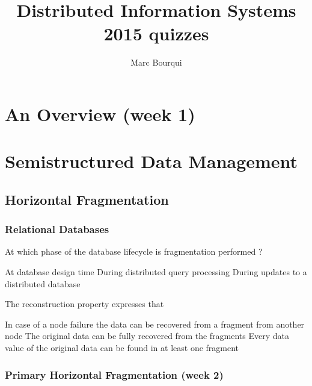 \documentclass[12pt,a4paper]{exam} %
\author{Marc Bourqui}
\title{Distributed Information Systems 2015 quizzes}
\begin{document}
\section{An Overview (week 1)}

\section{Semistructured Data Management}

\subsection{Horizontal Fragmentation}
\subsubsection{Relational Databases}
\begin{questions}

\question At which phase of the database lifecycle is fragmentation performed ?
\begin{checkboxes}
\CorrectChoice At database design time
\choice During distributed query processing
\choice During updates to a distributed database
\end{checkboxes}

\question The reconstruction property expresses that
\begin{checkboxes}
\choice In case of a node failure the data can be recovered from a fragment from another node
\CorrectChoice The original data can be fully recovered from the fragments
\choice Every data value of the original data can be found in at least one fragment
\end{checkboxes}
\end{questions}


\subsubsection{Primary Horizontal Fragmentation (week 2)} %
\end{document}
